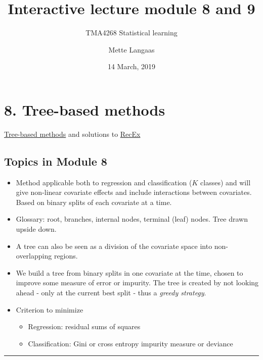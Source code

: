 \documentclass[]{article}
\title{Interactive lecture module 8 and 9}
\subtitle{TMA4268 Statistical learning}
\author{Mette Langaas}
\date{14 March, 2019}
\providecommand{\tightlist}{%
  \setlength{\itemsep}{0pt}\setlength{\parskip}{0pt}}
\begin{document}
\maketitle

{
\setcounter{tocdepth}{2}
\tableofcontents
}
\section{8. Tree-based methods}\label{tree-based-methods}

\href{https://www.math.ntnu.no/emner/TMA4268/2019v/8Trees/8Trees.html}{Tree-based
methods} and solutions to
\href{https://www.math.ntnu.no/emner/TMA4268/2019v/8Trees/8Trees-sol.html}{RecEx}

\subsection{Topics in Module 8}\label{topics-in-module-8}

\begin{itemize}
\tightlist
\item
  Method applicable both to regression and classification (\(K\)
  classes) and will give non-linear covariate effects and include
  interactions between covariates. Based on binary splits of each
  covariate at a time.
\item
  Glossary: root, branches, internal nodes, terminal (leaf) nodes. Tree
  drawn upside down.
\item
  A tree can also be seen as a division of the covariate space into
  non-overlapping regions.
\item
  We build a tree from binary splits in one covariate at the time,
  chosen to improve some measure of error or impurity. The tree is
  created by not looking ahead - only at the current best split - thus a
  \emph{greedy strategy}.
\item
  Criterion to minimize

  \begin{itemize}
  \tightlist
  \item
    Regression: residual sums of squares
  \item
    Classification: Gini or cross entropy impurity measure or deviance
  \end{itemize}
\end{itemize}

\begin{center}\rule{0.5\linewidth}{\linethickness}\end{center}
\end{document}
